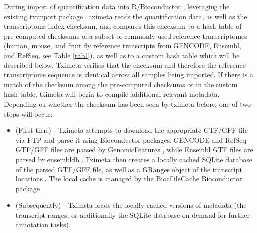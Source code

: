 \documentclass[12pt]{article} \usepackage[utf8]{inputenc}
\begin{document}
During import of quantification data into R/Bioconductor
\citep{bioc}, leveraging the existing tximport package
\citep{tximport}, tximeta reads the quantification data, as well as
the transcriptome index checksum, and compares this checksum to a hash
table of pre-computed checksums of a subset of commonly used reference
transcriptomes (human, mouse, and fruit fly reference transcripts from
GENCODE, Ensembl, and RefSeq, see Table \ref{tab1}), as well as to a
custom hash table which will be described below. Tximeta verifies that
the checksum and therefore the reference transcriptome sequence is
identical across all samples being imported. If there is a match of
the checksum among the pre-computed checksums or in the custom hash table,
tximeta will begin to compile additional relevant
metadata. Depending on whether the checksum has been seen by tximeta
before, one of two steps will occur:

\begin{itemize}
\item (First time) - Tximeta attempts to download the appropriate GTF/GFF
  file via FTP and parse it using Bioconductor packages. 
  GENCODE and RefSeq GTF/GFF files are parsed
  by GenomicFeatures \citep{granges}, while Ensembl GTF files are
  parsed by ensembldb \citep{ensembldb}. Tximeta then creates a
  locally cached SQLite database of the parsed GTF/GFF file, as well as a
  GRanges object of the transcript locations \citep{granges}. The
  local cache is managed by the BiocFileCache Bioconductor package
  \citep{biocfilecache}.
\item (Subsequently) - Tximeta loads the locally cached versions of
  metadata (the transcript ranges, or additionally the SQLite database
  on demand for further annotation tasks).
\end{itemize}
\end{document}
